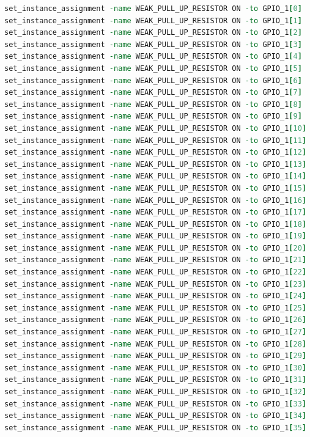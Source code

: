 \documentclass{capstonedoc}
\begin{document}
\begin{lstlisting}[language={tcl},caption={Commands to Enable GPIO Pull-Up Resistors},label={lst:qsf_pullup}]
set_instance_assignment -name WEAK_PULL_UP_RESISTOR ON -to GPIO_1[0]
set_instance_assignment -name WEAK_PULL_UP_RESISTOR ON -to GPIO_1[1]
set_instance_assignment -name WEAK_PULL_UP_RESISTOR ON -to GPIO_1[2]
set_instance_assignment -name WEAK_PULL_UP_RESISTOR ON -to GPIO_1[3]
set_instance_assignment -name WEAK_PULL_UP_RESISTOR ON -to GPIO_1[4]
set_instance_assignment -name WEAK_PULL_UP_RESISTOR ON -to GPIO_1[5]
set_instance_assignment -name WEAK_PULL_UP_RESISTOR ON -to GPIO_1[6]
set_instance_assignment -name WEAK_PULL_UP_RESISTOR ON -to GPIO_1[7]
set_instance_assignment -name WEAK_PULL_UP_RESISTOR ON -to GPIO_1[8]
set_instance_assignment -name WEAK_PULL_UP_RESISTOR ON -to GPIO_1[9]
set_instance_assignment -name WEAK_PULL_UP_RESISTOR ON -to GPIO_1[10]
set_instance_assignment -name WEAK_PULL_UP_RESISTOR ON -to GPIO_1[11]
set_instance_assignment -name WEAK_PULL_UP_RESISTOR ON -to GPIO_1[12]
set_instance_assignment -name WEAK_PULL_UP_RESISTOR ON -to GPIO_1[13]
set_instance_assignment -name WEAK_PULL_UP_RESISTOR ON -to GPIO_1[14]
set_instance_assignment -name WEAK_PULL_UP_RESISTOR ON -to GPIO_1[15]
set_instance_assignment -name WEAK_PULL_UP_RESISTOR ON -to GPIO_1[16]
set_instance_assignment -name WEAK_PULL_UP_RESISTOR ON -to GPIO_1[17]
set_instance_assignment -name WEAK_PULL_UP_RESISTOR ON -to GPIO_1[18]
set_instance_assignment -name WEAK_PULL_UP_RESISTOR ON -to GPIO_1[19]
set_instance_assignment -name WEAK_PULL_UP_RESISTOR ON -to GPIO_1[20]
set_instance_assignment -name WEAK_PULL_UP_RESISTOR ON -to GPIO_1[21]
set_instance_assignment -name WEAK_PULL_UP_RESISTOR ON -to GPIO_1[22]
set_instance_assignment -name WEAK_PULL_UP_RESISTOR ON -to GPIO_1[23]
set_instance_assignment -name WEAK_PULL_UP_RESISTOR ON -to GPIO_1[24]
set_instance_assignment -name WEAK_PULL_UP_RESISTOR ON -to GPIO_1[25]
set_instance_assignment -name WEAK_PULL_UP_RESISTOR ON -to GPIO_1[26]
set_instance_assignment -name WEAK_PULL_UP_RESISTOR ON -to GPIO_1[27]
set_instance_assignment -name WEAK_PULL_UP_RESISTOR ON -to GPIO_1[28]
set_instance_assignment -name WEAK_PULL_UP_RESISTOR ON -to GPIO_1[29]
set_instance_assignment -name WEAK_PULL_UP_RESISTOR ON -to GPIO_1[30]
set_instance_assignment -name WEAK_PULL_UP_RESISTOR ON -to GPIO_1[31]
set_instance_assignment -name WEAK_PULL_UP_RESISTOR ON -to GPIO_1[32]
set_instance_assignment -name WEAK_PULL_UP_RESISTOR ON -to GPIO_1[33]
set_instance_assignment -name WEAK_PULL_UP_RESISTOR ON -to GPIO_1[34]
set_instance_assignment -name WEAK_PULL_UP_RESISTOR ON -to GPIO_1[35]
\end{lstlisting}
\end{document}
